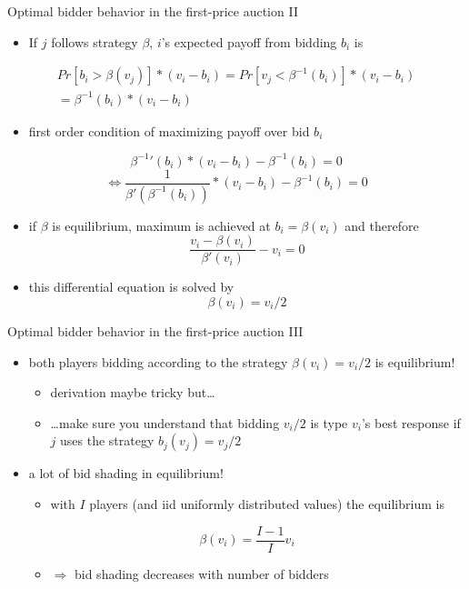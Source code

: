 \documentclass[bigger]{beamer}
\newcommand{\Ra}{\Rightarrow} \newcommand{\ra}{\rightarrow} \newcommand{\Lra}{\Leftrightarrow}
\begin{document}
\begin{frame}[label={sec:orga3badb0}]{Optimal bidder behavior in the ﬁrst-price auction II}
\begin{itemize}
\item If \(j\) follows strategy \(\beta\), \(i\)'s expected payoff from bidding \(b_i\) is
\end{itemize}
\begin{multline*}Pr[b_i>\beta(v_j)]*(v_i-b_i)= Pr[v_j<\beta^{-1}(b_i)]*(v_i-b_i)\\
= \beta^{-1}(b_i)*(v_i-b_i)
\end{multline*}
\vspace*{-0.5cm}
\begin{itemize}
\item first order condition of maximizing payoff over bid \(b_i\)
\end{itemize}
$$ {\beta^{-1}}'(b_i)*(v_i-b_i)-\beta^{-1}(b_i)=0$$
$$\Lra \frac{1}{\beta'(\beta^{-1}(b_i))}*(v_i-b_i)-\beta^{-1}(b_i)=0$$
\begin{itemize}
\item if \(\beta\) is equilibrium, maximum is achieved at \(b_i=\beta(v_i)\) and therefore
$$\frac{v_i-\beta(v_i)}{\beta'(v_i)}-v_i=0$$
\item this differential equation is solved by $$\beta(v_i)=v_i/2$$
\end{itemize}
\end{frame}

\begin{frame}[label={sec:org6e5cd79}]{Optimal bidder behavior in the ﬁrst-price auction III}
\begin{itemize}
\item both players bidding according to the strategy \(\beta(v_i)=v_i/2\) is equilibrium!
\begin{itemize}
\item derivation maybe tricky but\ldots{}
\item \ldots{}make sure you understand that bidding \(v_i/2\) is type \(v_i\)'s best response if \(j\) uses the strategy \(b_j(v_j)=v_j/2\)
\end{itemize}
\item a lot of bid shading in equilibrium!
\begin{itemize}
\item with \(I\) players (and iid uniformly distributed values) the equilibrium is
\end{itemize}
$$\beta(v_i)=\frac{I-1}{I}v_i$$
\begin{itemize}
\item \(\Ra\) bid shading decreases with number of bidders
\end{itemize}
\end{itemize}
\end{frame}
\end{document}
